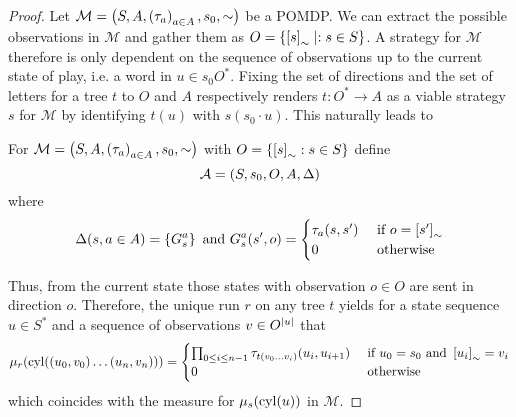 \begin{proof}
  Let $\mathcal{M} = \left(S, A, \left(\tau_{a}\right)_{a\in A}, s_{0}, \sim\right)$ be a
  \ac{POMDP}. We can extract the possible observations in $\mathcal{M}$ and
  gather them as $O = \left\{\left[s\right]_{\sim}\mid:s\in S\right\}$. A strategy for
  $\mathcal{M}$ therefore is only dependent on the sequence of observations up
  to the current state of play, i.e. a word in $u\in s_{0}O^{*}$. Fixing the
  set of directions and the set of letters for a tree $t$ to $O$ and $A$
  respectively renders $t:O^{*}\rightarrow A$ as a viable strategy $s$ for
  $\mathcal{M}$ by identifying $t(u)$ with $s(s_{0}\cdot u)$. This naturally
  leads to
  \begin{definition}
    For $\mathcal{M} = \left(S, A, \left(\tau_{a}\right)_{a\in A}, s_{0}, \sim\right)$
    with $O = \left\{\left[s\right]_{\sim}: s\in S\right\}$ define
    \begin{equation*}
      \mathcal{A} = \left(S, s_{0}, O, A, \Delta\right)
    \end{equation*}
    where
    \begin{equation*}
      \Delta(s, a\in A) = \left\{G_{s}^{a}\right\}\text{ and }
      G_{s}^{a}(s', o) = \begin{cases}
        \tau_{a}(s, s')&\text{ if }o = \left[s'\right]_{\sim}\\
        0              &\text{ otherwise}
      \end{cases}
    \end{equation*}
  \end{definition}
  Thus, from the current state those states with observation $o\in O$ are sent
  in direction $o$. Therefore, the unique run $r$ on any tree $t$ yields for a
  state sequence $u\in S^{*}$ and a sequence of observations $v\in O^{\left\vert{u}\right\vert}$
  that
  \begin{equation*}
    \mu_{r}(\operatorname{cyl}(\left(u_{0},v_{0}\right)\dots\left(u_{n},v_{n}\right))) =
    \begin{cases}
      \prod_{0\leq i\leq n-1}\tau_{t(v_{0}\dots v_{i})}(u_{i}, u_{i+1})
        &\text{ if }u_{0} = s_{0}\text{ and }\left[u_{i}\right]_{\sim} = v_{i}\\
      0 &\text{ otherwise}
    \end{cases}
  \end{equation*}
  which coincides with the measure for $\mu_{s}(\operatorname{cyl}(u))$ in $\mathcal{M}$.
\end{proof}

